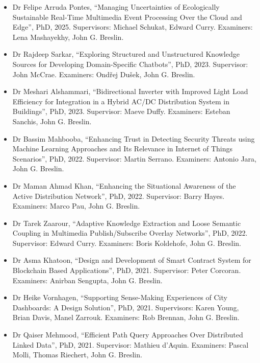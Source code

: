 \documentclass[10pt,a4paper]{res} %
\begin{document}
\begin{resume}
\begin{itemize} \itemsep -2pt
\item Dr Felipe Arruda Pontes, ``Managing Uncertainties of Ecologically Sustainable Real-Time Multimedia Event Processing Over the Cloud and Edge'', PhD, 2025. Supervisors: Michael Schukat, Edward Curry. Examiners: Lena Mashayekhy, John G. Breslin. %
\item Dr Rajdeep Sarkar, ``Exploring Structured and Unstructured Knowledge Sources for Developing Domain-Specific Chatbots'', PhD, 2023. Supervisor: John McCrae. Examiners: Ond\v{r}ej Du\v{s}ek, John G. Breslin. %
\item Dr Meshari Alshammari, ``Bidirectional Inverter with Improved Light Load Efficiency for Integration in a Hybrid AC/DC Distribution System in Buildings'', PhD, 2023. Supervisor: Maeve Duffy. Examiners: Esteban Sanchis, John G. Breslin. %
\item Dr Bassim Mahbooba, ``Enhancing Trust in Detecting Security Threats using Machine Learning Approaches and Its Relevance in Internet of Things Scenarios'', PhD, 2022. Supervisor: Martin Serrano. Examiners: Antonio Jara, John G. Breslin. %
\item Dr Maman Ahmad Khan, ``Enhancing the Situational Awareness of the Active Distribution Network'', PhD, 2022. Supervisor: Barry Hayes. Examiners: Marco Pau, John G. Breslin. %
\item Dr Tarek Zaarour, ``Adaptive Knowledge Extraction and Loose Semantic Coupling in Multimedia Publish/Subscribe Overlay Networks'', PhD, 2022. Supervisor: Edward Curry. Examiners: Boris Koldehofe, John G. Breslin. %
\item Dr Asma Khatoon, ``Design and Development of Smart Contract System for Blockchain Based Applications'', PhD, 2021. Supervisor: Peter Corcoran. Examiners: Anirban Sengupta, John G. Breslin. %
\item Dr Heike Vornhagen, ``Supporting Sense-Making Experiences of City Dashboards: A Design Solution'', PhD, 2021. Supervisors: Karen Young, Brian Davis, Manel Zarrouk. Examiners: Rob Brennan, John G. Breslin. %
\item Dr Qaiser Mehmood, ``Efficient Path Query Approaches Over Distributed Linked Data'', PhD, 2021. Supervisor: Mathieu d'Aquin. Examiners: Pascal Molli, Thomas Riechert, John G. Breslin.

\end{itemize}
\end{resume}
\end{document}
